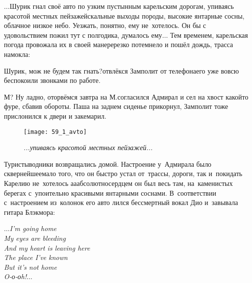
$\ldots$Шурик гнал своё авто по узким пустынным карельским дорогам, упиваясь красотой местных пейзажей\mdash скальные выходы породы, высокие янтарные сосны, облачное низкое небо. Уезжать, понятно, ему не~хотелось. Он бы с удовольствием пожил тут с полгодика, думалось ему$\ldots$ Тем временем, карельская погода провожала их в своей манере\mdash резко потемнело и пошёл дождь, трасса намокла:

{
\diagdash Шурик, мож не будем так гнать?\mdash отвлёкся Замполит от телефона\mdash его уже вовсю беспокоили звонками по работе.

\diagdash М? Ну ладно, оторвёмся завтра на М.\mdash согласился Адмирал и сел на хвост какой\sdash то фуре, сбавив обороты. Паша на заднем сиденье прикорнул, Замполит тоже прислонился к двери и закемарил.
}

\newpage

\begin{figure}[h]
	\centering
	\texttt{[image: 59\_1\_avto]}
	\caption{\small\textit{...упиваясь красотой местных пейзажей...}}
\end{figure}
Туристы\sdash водники возвращались домой. Настроение у~Адмирала было сквернейшее\mdash мало того, что он быстро устал от~трассы, дороги, так и~покидать Карелию не~хотелось а\sdash а\sdash абсолютно\mdash сердцем он был весь там, на~каменистых берегах с~упоительно красивыми янтарными соснами. В~соответствии с~настроением из~колонок его авто лился бессмертный вокал Дио и~завывала гитара Блэкмора:

\vspace{0.3cm}
\noindent\textit{%
	\hspace*{3.4cm}$\ldots$I'm going home\\
	\hspace*{3.4cm}My eyes are bleeding\\
	\hspace*{3.4cm}And my heart is leaving here\\
	\hspace*{3.4cm}The place I've known\\
	\hspace*{3.4cm}But it's not home\\
	\hspace*{3.4cm}O-о-оh!$\ldots$\\		
}
\vspace{0.3cm} 

